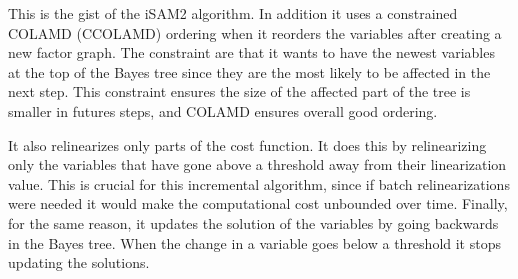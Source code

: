 This is the gist of the iSAM2 algorithm. In addition it uses a constrained COLAMD (CCOLAMD) ordering when it reorders the variables after creating a new factor graph. The constraint are that it wants to have the newest variables at the top of the Bayes tree since they are the most likely to be affected in the next step. This constraint ensures the size of the affected part of the tree is smaller in futures steps, and COLAMD ensures overall good ordering. 

It also relinearizes only parts of the cost function. It does this by relinearizing only the variables that have gone above a threshold away from their linearization value. This is crucial for this incremental algorithm, since if batch relinearizations were needed it would make the computational cost unbounded over time. Finally, for the same reason, it updates the solution of the variables by going backwards in the Bayes tree. When the change in a variable goes below a threshold it stops updating the solutions. 
